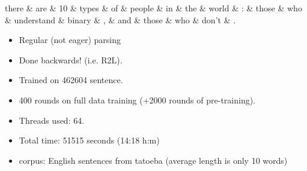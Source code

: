 \documentclass[12pt]{extarticle}
\begin{document}
{\scriptsize
\begin{dependency}[theme = simple]
\begin{deptext}[column sep=1em]
     there \& are \& 10 \& types \& of \& people \& in \& the \& world \& : \& those \& who \& understand \& binary \& , \& and \& those \& who \& don't \& .  \\
\end{deptext}
\end{dependency}
}
\vfill
\begin{center}
\begin{minipage}{6in}
\begin{itemize}
\item Regular (not eager) parsing
\item Done backwards! (i.e. R2L).
\item Trained on 462604 sentence.    
\item 400 rounds on full data training (+2000 rounds of pre-training).
\item Threads used: 64.
\item Total time: 51515 seconds  (14:18 h:m)
\item corpus: English sentences from tatoeba (average length is only
10 words)
\end{itemize}
\end{minipage}
\end{center}
\end{document}

